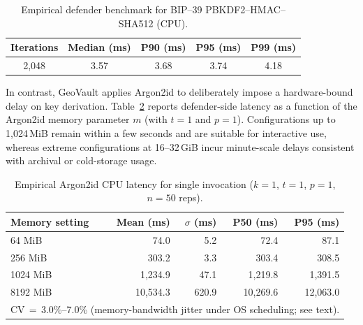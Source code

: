 \documentclass[journal,article,accept,pdftex,moreauthors]{Definitions/mdpi}
\begin{document}
\begin{table}[H]
\caption{Empirical defender benchmark for BIP--39 PBKDF2--HMAC--SHA512 (CPU).}
\label{tab:defender_cost_bip39}
\centering
\begin{tabular}{ccccc}
\toprule
\textbf{Iterations} & \textbf{Median (ms)} & \textbf{P90 (ms)} & \textbf{P95 (ms)} & \textbf{P99 (ms)} \\
\midrule
2{,}048 & 3.57 & 3.68 & 3.74 & 4.18 \\
\bottomrule
\end{tabular}
\end{table}

In contrast, GeoVault applies Argon2id to deliberately impose a hardware-bound delay on key derivation. Table~\ref{tab:argon2_defender_cost} reports defender-side latency as a function of the Argon2id memory parameter $m$ (with $t=1$ and $p=1$). Configurations up to 1{,}024\,MiB remain within a few seconds and are suitable for interactive use, whereas extreme configurations at 16--32\,GiB incur minute-scale delays consistent with archival or cold-storage usage.

\begin{table}[H]
\caption{Empirical Argon2id CPU latency for single invocation ($k=1$, $t=1$, $p=1$, $n=50$ reps).}
\label{tab:argon2_defender_cost}
\centering
\begin{tabular}{lrrrr}
\toprule
\textbf{Memory setting} & \textbf{Mean (ms)} & \textbf{$\sigma$ (ms)} & \textbf{P50 (ms)} & \textbf{P95 (ms)} \\
\midrule
64 MiB   & 74.0        & 5.2         & 72.4        & 87.1        \\
256 MiB  & 303.2       & 3.3         & 303.4       & 308.5       \\
1024 MiB & 1{,}234.9   & 47.1        & 1{,}219.8   & 1{,}391.5   \\
8192 MiB & 10{,}534.3  & 620.9       & 10{,}269.6  & 12{,}063.0  \\
\bottomrule
\multicolumn{5}{l}{\footnotesize CV\,$=$\,3.0\%--7.0\% (memory-bandwidth jitter under OS scheduling; see text).}
\end{tabular}
\end{table}
\end{document}
